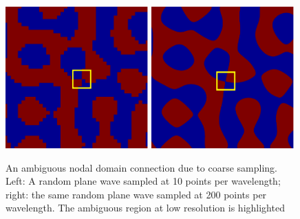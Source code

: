 \documentclass{report}
\begin{document}
\begin{figure}
  \begin{center}
    \includegraphics[width=0.49\textwidth]{figs/interpolation/eigenfunction_error_low.eps}
    \includegraphics[width=0.49\textwidth]{figs/interpolation/eigenfunction_error_high.eps}
    \caption{An ambiguous nodal domain connection due to coarse sampling. Left: A random plane wave sampled at 10 points per wavelength; right: the same random plane wave sampled at 200 points per wavelength. The ambiguous region at low resolution is highlighted}
    \label{fig:miscounts}
  \end{center}
\end{figure}
\end{document}

